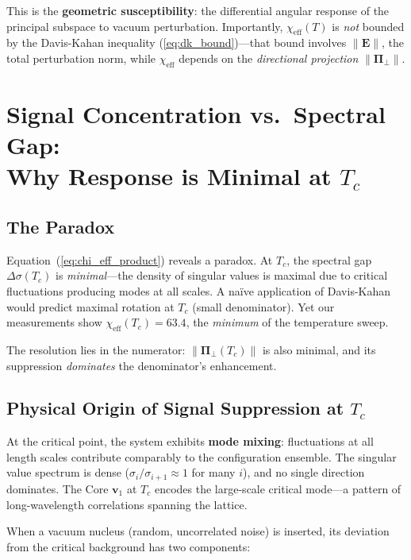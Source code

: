 \documentclass[aps,prl,twocolumn,superscriptaddress,byrevtex]{article}
\begin{document}
This is the \textbf{geometric susceptibility}: the differential angular response of the principal subspace to vacuum perturbation. Importantly, $\chi_{\text{eff}}(T)$ is \emph{not} bounded by the Davis-Kahan inequality (\ref{eq:dk_bound})---that bound involves $\|\mathbf{E}\|$, the total perturbation norm, while $\chi_{\text{eff}}$ depends on the \emph{directional projection} $\|\boldsymbol{\Pi}_\perp\|$.

\section{Signal Concentration vs.\ Spectral Gap: \\
Why Response is Minimal at \texorpdfstring{$T_c$}{Tc}}

\subsection{The Paradox}

Equation~(\ref{eq:chi_eff_product}) reveals a paradox. At $T_c$, the spectral gap $\Delta\sigma(T_c)$ is \emph{minimal}---the density of singular values is maximal due to critical fluctuations producing modes at all scales. A na\"ive application of Davis-Kahan would predict maximal rotation at $T_c$ (small denominator). Yet our measurements show $\chi_{\text{eff}}(T_c) = 63.4$, the \emph{minimum} of the temperature sweep.

The resolution lies in the numerator: $\|\boldsymbol{\Pi}_\perp(T_c)\|$ is also minimal, and its suppression \emph{dominates} the denominator's enhancement.

\subsection{Physical Origin of Signal Suppression at \texorpdfstring{$T_c$}{Tc}}

At the critical point, the system exhibits \textbf{mode mixing}: fluctuations at all length scales contribute comparably to the configuration ensemble. The singular value spectrum is dense ($\sigma_i / \sigma_{i+1} \approx 1$ for many $i$), and no single direction dominates. The Core $\mathbf{v}_1$ at $T_c$ encodes the large-scale critical mode---a pattern of long-wavelength correlations spanning the lattice.

When a vacuum nucleus (random, uncorrelated noise) is inserted, its deviation from the critical background has two components:
\end{document}
